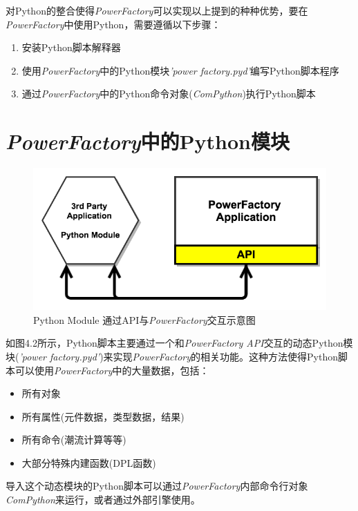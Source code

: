 对Python的整合使得\emph{PowerFactory}可以实现以上提到的种种优势，要在\emph{PowerFactory}中使用Python，需要遵循以下步骤：

\begin{enumerate}
\item 安装Python脚本解释器
\item 使用\emph{PowerFactory}中的Python模块\emph{'power factory.pyd'}编写Python脚本程序
\item 通过\emph{PowerFactory}中的Python命令对象(\emph{ComPython})执行Python脚本
\end{enumerate}

\section{\emph{PowerFactory}中的Python模块}

\begin{figure}[H]
\centering
\includegraphics[width=1.05\textwidth]{images/Paper_Fig_13.png}
\setcaptionwidth{\linewidth}
\caption{Python Module 通过API与\emph{PowerFactory}交互示意图}
\end{figure}

如图4.2所示，Python脚本主要通过一个和\emph{PowerFactory API}交互的动态Python模块(\emph{'power factory.pyd'})来实现\emph{PowerFactory}的相关功能。这种方法使得Python脚本可以使用\emph{PowerFactory}中的大量数据，包括：

\begin{itemize}
\item 所有对象
\item 所有属性(元件数据，类型数据，结果)
\item 所有命令(潮流计算等等)
\item 大部分特殊内建函数(DPL函数)
\end{itemize}

导入这个动态模块的Python脚本可以通过\emph{PowerFactory}内部命令行对象\emph{ComPython}来运行，或者通过外部引擎使用。

